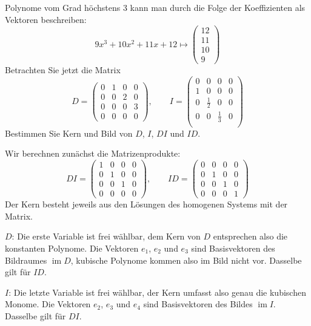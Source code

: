 Polynome vom Grad höchstens 3 kann man durch die Folge der
Koeffizienten als Vektoren beschreiben:
\[
9x^3+10x^2+11x+12\mapsto 
\begin{pmatrix}
12\\11\\10\\9
\end{pmatrix}
\]
Betrachten Sie jetzt die Matrix
\[
D=\begin{pmatrix}
0&1&0&0\\
0&0&2&0\\
0&0&0&3\\
0&0&0&0
\end{pmatrix},
\qquad
I=\begin{pmatrix}
0&0&0&0\\
1&0&0&0\\
0&\frac12&0&0\\
0&0&\frac13&0\\
\end{pmatrix}
\]
Bestimmen Sie Kern und Bild von $D$, $I$, $DI$ und $ID$.


\begin{loesung}
Wir berechnen zunächst die Matrizenprodukte:
\[
DI=\begin{pmatrix}
1&0&0&0\\
0&1&0&0\\
0&0&1&0\\
0&0&0&0
\end{pmatrix},\qquad
ID=\begin{pmatrix}
0&0&0&0\\
0&1&0&0\\
0&0&1&0\\
0&0&0&1
\end{pmatrix}
\]
Der Kern besteht jeweils aus den Lösungen des homogenen Systems mit der
Matrix.

$D$: Die erste Variable ist frei wählbar, dem Kern von $D$ entsprechen also
die konstanten Polynome. Die Vektoren $e_1$, $e_2$ und $e_3$ sind Basisvektoren
des Bildraumes $\operatorname{im}D$, kubische Polynome kommen also im Bild
nicht vor. Dasselbe gilt für $ID$.

$I$: Die letzte Variable ist frei wählbar, der Kern umfasst also
genau die kubischen Monome. Die Vektoren $e_2$, $e_3$ und $e_4$
sind Basisvektoren des Bildes $\operatorname{im}I$. Dasselbe gilt
für $DI$.
\end{loesung}


